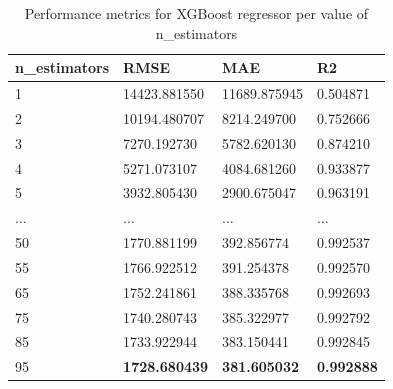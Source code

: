 \begin{table}[h]
    \centering
    \begin{tabularx}{\textwidth}{XXXX}
    \hline
    \textbf{n\_estimators} & \textbf{RMSE} & \textbf{MAE} & \textbf{R2} \\
    \hline
    1 & 14423.881550 & 11689.875945 & 0.504871 \\
    2 & 10194.480707 & 8214.249700 & 0.752666 \\
    3 & 7270.192730 & 5782.620130 & 0.874210 \\
    4 & 5271.073107 & 4084.681260 & 0.933877 \\
    5 & 3932.805430 & 2900.675047 & 0.963191 \\
    ...&...&...&...\\
    50 & 1770.881199 & 392.856774 & 0.992537 \\
    55 & 1766.922512 & 391.254378 & 0.992570 \\
    65 & 1752.241861 & 388.335768 & 0.992693 \\
    75 & 1740.280743 & 385.322977 & 0.992792 \\
    85 & 1733.922944 & 383.150441 & 0.992845 \\
    95 & \textbf{1728.680439} & \textbf{381.605032} & \textbf{0.992888} \\
    \hline
    \end{tabularx}
    \caption{Performance metrics for XGBoost regressor per value of n\_estimators}
    \label{tab:XGBoost score per N_estimators}
\end{table}

